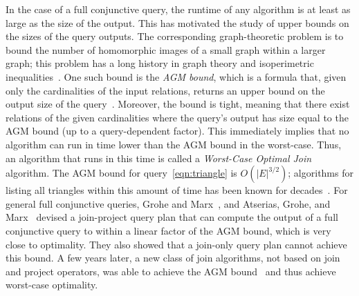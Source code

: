 \documentclass[10pt,a4paper]{article}
\newcommand{\agm}{\textsf{AGM}\xspace}
\begin{document}
In the case of a full conjunctive query, the runtime of any algorithm is at least as large
as the size of the output.  This has motivated the study of upper bounds on the sizes of the
query outputs. The corresponding graph-theoretic problem is to bound the number of
homomorphic images of a small graph within a larger graph; this problem has a long history
in graph theory and isoperimetric
inequalities~\cite{MR0031538,MR599482,MR859293,MR1338683,10.1145/3196959.3196990,MR1639767}.
One such bound is the {\em \agm bound}, which is a formula that, given only the
cardinalities of the input relations, returns an upper bound on the output size of the
query~\cite{DBLP:journals/siamcomp/AtseriasGM13}. Moreover, the bound is tight, meaning that
there exist relations of the given cardinalities where the query's output has size equal to
the \agm bound (up to a query-dependent factor).  This immediately implies that no algorithm
can run in time lower than the \agm bound in the worst-case. Thus, an algorithm that runs in
this time is called a {\em Worst-Case Optimal Join}
algorithm.
The \agm bound for
query~\eqref{eqn:triangle} is $O(|E|^{3/2})$; algorithms for listing all triangles within
this amount of time has been known for decades~\cite{DBLP:conf/stoc/Itai77}.
For general full conjunctive queries, Grohe and Marx~\cite{DBLP:conf/soda/GroheM06}, and
Atserias, Grohe, and Marx~\cite{DBLP:journals/siamcomp/AtseriasGM13,DBLP:conf/focs/AtseriasGM08}
devised a join-project query plan that can compute the output of a full conjunctive query
to within a linear factor of the \agm bound, which is very close to optimality.
They also showed that a join-only query plan cannot achieve this bound.
A few years later, a new class of join algorithms, not based on join and project operators,
was able to achieve the \agm bound~\cite{DBLP:conf/icdt/Veldhuizen14,DBLP:journals/jacm/NgoPRR18}
and thus achieve worst-case optimality.
\end{document}
